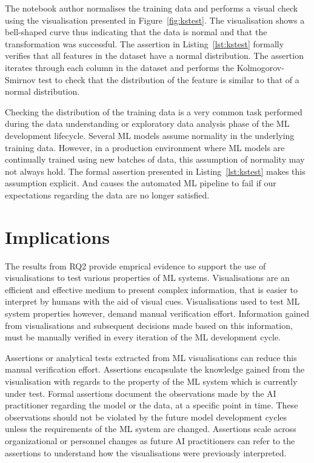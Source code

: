 \documentclass[conference]{IEEEtran}
\begin{document}
The notebook author normalises the training data and performs a visual check using the visualisation presented in Figure~\ref{fig:kstest}. The visualisation shows a bell-shaped curve thus indicating that the data is normal and that the transformation was successful. The assertion in Listing~\ref{lst:kstest} formally verifies that all features in the dataset have a normal distribution. The assertion iterates through each column in the dataset and performs the Kolmogorov-Smirnov test to check that the distribution of the feature is similar to that of a normal distribution.

Checking the distribution of the training data is a very common task performed during the data understanding or exploratory data analysis phase of the ML development lifecycle. Several ML models assume normality in the underlying training data. However, in a production environment where ML models are continually trained using new batches of data, this assumption of normality may not always hold. The formal assertion presented in Listing~\ref{lst:kstest} makes this assumption explicit. And causes the automated ML pipeline to fail if our expectations regarding the data are no longer satisfied.

\section{Implications}\label{sec:discuss}

The results from RQ2 provide emprical evidence to support the use of visualisations to test various properties of ML systems.  Visualisations are an efficient and effective medium to present complex information, that is easier to interpret by humans with the aid of visual cues. Visualisations used to test ML system properties however, demand manual verification effort. Information gained from visualisations and subsequent decisions made based on this information, must be manually verified in every iteration of the ML development cycle.


Assertions or analytical tests extracted from ML visualisations can reduce this manual verification effort. Assertions encapsulate the knowledge gained from the visualisation with regards to the property of the ML system which is currently under test. Formal assertions document the observations made by the AI practitioner regarding the model or the data, at a specific point in time. These observations should not be violated by the future model development cycles unless the requirements of the ML system are changed. Assertions scale across organizational or personnel changes as future AI practitioners can refer to the assertions to understand how the visualisations were previously interpreted.
\end{document}
